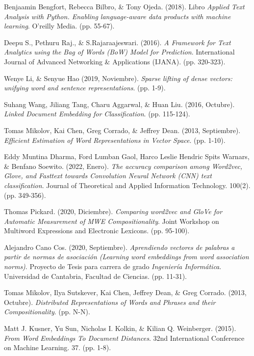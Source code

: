 \documentclass[12pt,a4paper]{article}
\begin{document}
\begin{sloppypar}
\begin{thebibliography}{9}
Benjaamin Bengfort, Rebecca Bilbro, \& Tony Ojeda. (2018). Libro \textit{Applied Text Analysis with Python. Enabling language-aware data products with machine learning}. O’reilly Media. (pp. 55-67).

Deepu S., Pethuru Raj., \& S.Rajaraajeswari. (2016). \textit{A Framework for Text Analytics using the Bag of Words (BoW) Model for Prediction}. International Journal of Advanced Networking \& Applications (IJANA). (pp. 320-323).

Wenye Li, \& Senyue Hao (2019, Noviembre). \textit{Sparse lifting of dense vectors: unifying word and sentence representations}. (pp. 1-9).

Suhang Wang, Jiliang Tang, Charu Aggarwal, \& Huan Liu. (2016, Octubre). \textit{Linked Document Embedding for Classiﬁcation}. (pp. 115-124).

Tomas Mikolov, Kai Chen, Greg Corrado, \& Jeffrey Dean. (2013, Septiembre). \textit{Efficient Estimation of Word Representations in Vector Space}. (pp. 1-10).

Eddy Muntina Dharma, Ford Lumban Gaol, Harco Leslie Hendric Spits Warnars, \& Benfano Soewito. (2022, Enero). \textit{The accuracy comparison among Word2vec, Glove, and Fasttext towards Convolution Neural Network (CNN) text classification}. Journal of Theoretical and Applied Information Technology. 100(2). (pp. 349-356).

Thomas Pickard. (2020, Diciembre). \textit{Comparing word2vec and GloVe for Automatic Measurement of MWE Compositionality}. Joint Workshop on Multiword Expressions and Electronic Lexicons. (pp. 95-100).

Alejandro Cano Cos. (2020, Septiembre). \textit{Aprendiendo vectores de palabras a partir de normas de asociación (Learning word embeddings from word association norms)}. Proyecto de Tesis para carrera de grado \textit{Ingeniería Informática}. Universidad de Cantabria, Facultad de Ciencias. (pp. 11-31).

Tomas Mikolov, Ilya Sutskever, Kai Chen, Jeffrey Dean, \& Greg Corrado. (2013, Octubre). \textit{Distributed Representations of Words and Phrases and their Compositionality}. (pp. N-N).

Matt J. Kusner, Yu Sun, Nicholas I. Kolkin, \& Kilian Q. Weinberger. (2015). \textit{From Word Embeddings To Document Distances}. 32nd International Conference on Machine Learning. 37. (pp. 1-8).


\end{thebibliography}
\end{sloppypar}
\end{document}
